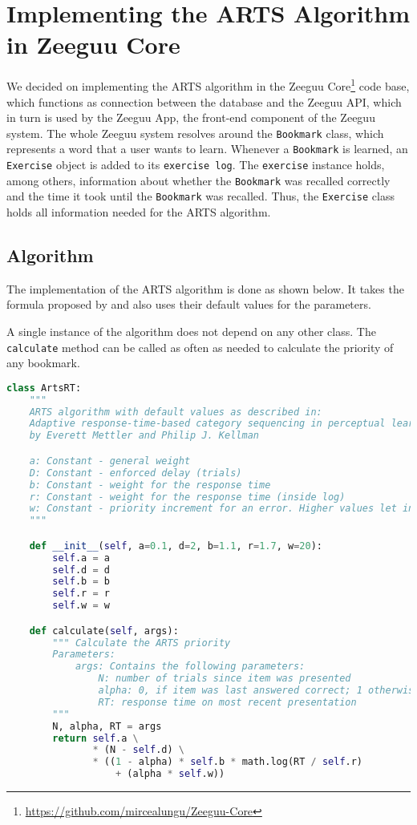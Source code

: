 \documentclass{article}
\begin{document}
\section{Implementing the ARTS Algorithm in Zeeguu Core}
We decided on implementing the ARTS algorithm in the Zeeguu Core\footnote{\url{https://github.com/mircealungu/Zeeguu-Core}} code base, which functions as connection between the database and the Zeeguu API, which in turn is used by the Zeeguu App, the front-end component of the Zeeguu system. The whole Zeeguu system resolves around the \lstinline|Bookmark| class, which represents a word that a user wants to learn. Whenever a \lstinline|Bookmark| is learned, an \lstinline|Exercise| object is added to its \lstinline|exercise log|. The \lstinline|exercise| instance holds, among others, information about whether the \lstinline|Bookmark| was recalled correctly and the time it took until the \lstinline|Bookmark| was recalled. Thus, the \lstinline|Exercise| class holds all information needed for the ARTS algorithm. 

\subsection{Algorithm}
The implementation of the ARTS algorithm is done as shown below. It takes the formula proposed by \cite{mettler2014adaptive} and also uses their default values for the parameters.

A single instance of the algorithm does not depend on any other class. The \lstinline|calculate| method can be called as often as needed to calculate the priority of any bookmark.

\begin{lstlisting}[language=Python,frame=single] 
class ArtsRT:
    """
    ARTS algorithm with default values as described in:
    Adaptive response-time-based category sequencing in perceptual learning
    by Everett Mettler and Philip J. Kellman

    a: Constant - general weight
    D: Constant - enforced delay (trials)
    b: Constant - weight for the response time
    r: Constant - weight for the response time (inside log)
    w: Constant - priority increment for an error. Higher values let incorrect items appear quicker again
    """

    def __init__(self, a=0.1, d=2, b=1.1, r=1.7, w=20):
        self.a = a
        self.d = d
        self.b = b
        self.r = r
        self.w = w

    def calculate(self, args):
        """ Calculate the ARTS priority
        Parameters:
            args: Contains the following parameters:
                N: number of trials since item was presented
                alpha: 0, if item was last answered correct; 1 otherwise
                RT: response time on most recent presentation
        """
        N, alpha, RT = args
        return self.a \
               * (N - self.d) \
               * ((1 - alpha) * self.b * math.log(RT / self.r)
                   + (alpha * self.w))
\end{lstlisting}
\end{document}
